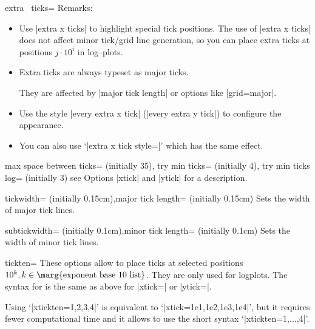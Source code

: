 \begin{pgfplotsxykey}{extra \x\ ticks=}
Remarks:
\begin{itemize} 
\item Use |extra x ticks| to highlight special tick positions. The use of |extra x ticks| does not affect minor tick/grid line generation, so you can place extra ticks at positions $j\cdot 10^i$ in log--plots. 
\item Extra ticks are always typeset as major ticks.

They are affected by |major tick length| or options like |grid=major|.
\item Use the style |every extra x tick| (|every extra y tick|) to configure the appearance.
\item You can also use `|extra x tick style=|' which has the same effect.
\end{itemize}
\end{pgfplotsxykey}

\begin{pgfplotskeylist}{
	max space between ticks= (initially 35),
	try min ticks= (initially 4),
	try min ticks log= (initially 3)}
see Options |xtick| and |ytick| for a description.
\end{pgfplotskeylist}

\begin{pgfplotskeylist}{tickwidth= (initially 0.15cm),major tick length= (initially 0.15cm)}
	Sets the width of major tick lines.
\end{pgfplotskeylist}

\begin{pgfplotskeylist}{subtickwidth= (initially 0.1cm),minor tick length= (initially 0.1cm)}
	Sets the width of minor tick lines.
\end{pgfplotskeylist}

\begin{pgfplotsxykey}{\x tickten=}
These options allow to place ticks at selected positions $10^k, k \in \text{\marg{exponent base 10 list}}$. They are only used for logplots. The syntax for  is the same as above for |xtick=| or |ytick=|.

Using `|xtickten={1,2,3,4}|' is equivalent to `|xtick={1e1,1e2,1e3,1e4}|', but it requires fewer computational time and it allows to use the short syntax `|xtickten={1,...,4}|'.
\begin{codeexample}[]
\end{codeexample}
\end{pgfplotsxykey}

